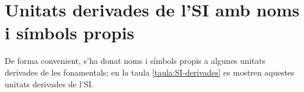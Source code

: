  
      
       
       
                    \index{\unit{\micro\noop}}   


\section{Unitats derivades de l'SI amb noms i símbols propis}
\label{sec:unitata-derv-SI}

De forma convenient, s'ha donat noms i símbols propis a algunes unitats derivades de les fonamentals; en la taula \vref{taula:SI-derivades} es mostren aquestes unitats derivades de l'SI.


